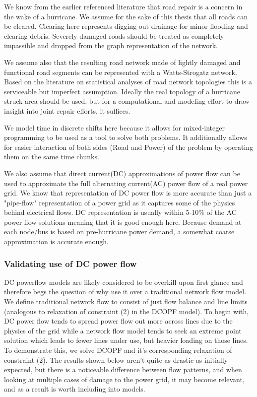 \documentclass{article}
\begin{document}
	We know from the earlier referenced literature that road repair is a concern in the wake of a hurricane. We assume for the sake of this thesis that all roads can be cleared. Clearing here represents digging out drainage for minor flooding and clearing debris. Severely damaged roads should be treated as completely impassible and dropped from the graph representation of the network.
	
	We assume also that the resulting road network made of lightly damaged and functional road segments can be represented with a Watts-Strogatz network. Based on the literature on statistical analyses of road network topologies \cite{LammerEA2006} \cite{ChanEA2011} this is a serviceable but imperfect assumption. Ideally the real topology of a hurricane struck area should be used, but for a computational and modeling effort to draw insight into joint repair efforts, it suffices.
		
	We model time in discrete shifts here because it allows for mixed-integer programming to be used as a tool to solve both problems. It additionally allows for easier interaction of both sides (Road and Power) of the problem by operating them on the same time chunks.
	
	We also assume that direct current(DC) approximations of power flow can be used to approximate the full alternating current(AC) power flow of a real power grid. We know that representation of DC power flow is more accurate than just a "pipe-flow" representation of a power grid as it captures some of the physics behind electrical flows. DC representation is usually within 5-10\% of the AC power flow solutions \cite{Frank2016} \cite{StottEA2009} meaning that it is good enough here. Because demand at each node/bus is based on pre-hurricane power demand, a somewhat coarse approximation is accurate enough.  
	\subsubsection{Validating use of DC power flow}
	
	DC powerflow models are likely considered to be overkill upon first glance and therefore begs the question of why use it over a traditional network flow model. We define traditional network flow to consist of just flow balance and line limits (analogous to relaxation of constraint (2) in the DCOPF model). To begin with, DC power flow tends to spread power flow out more across lines due to the physics of the grid while a network flow model tends to seek an extreme point solution which leads to fewer lines under use, but heavier loading on those lines. To demonstrate this, we solve DCOPF and it's corresponding relaxation of constraint (2). The results shown below aren't quite as drastic as initially expected, but there is a noticeable difference between flow patterns, and when looking at multiple cases of damage to the power grid, it may become relevant, and as a result is worth including into models.
	
\end{document}
